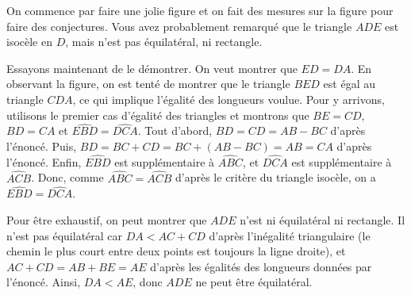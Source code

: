 \begin{sol}
On commence par faire une jolie figure et on fait des mesures sur la figure pour faire des conjectures.
\newline
Vous avez probablement remarqué que le triangle $ADE$ est isocèle en $D$, mais n'est pas équilatéral, ni rectangle.

Essayons maintenant de le démontrer. On veut montrer que $ED=DA$. En observant la figure, on est tenté de montrer que le triangle $BED$ est égal au triangle $CDA$, ce qui implique l'égalité des longueurs voulue. Pour y arrivons, utilisons le premier cas d'égalité des triangles et montrons que $BE=CD$, $BD=CA$ et $\widehat{EBD}=\widehat{DCA}$. Tout d'abord, $BD=CD=AB-BC$ d'après l'énoncé. Puis, $BD=BC+CD=BC+(AB-BC)=AB=CA$ d'après l'énoncé. Enfin, $\widehat{EBD}$ est supplémentaire à $\widehat{ABC}$, et $\widehat{DCA}$ est supplémentaire à $\widehat{ACB}$. Donc, comme $\widehat{ABC}=\widehat{ACB}$ d'après le critère du triangle isocèle, on a $\widehat{EBD}=\widehat{DCA}$.

Pour être exhaustif, on peut montrer que $ADE$ n'est ni équilatéral ni rectangle. Il n'est pas équilatéral car $DA<AC+CD$ d'après l'inégalité triangulaire (le chemin le plus court entre deux points est toujours la ligne droite), et $AC+CD=AB+BE=AE$ d'après les égalités des longueurs données par l'énoncé. Ainsi, $DA<AE$, donc $ADE$ ne peut être équilatéral.


\end{sol}
